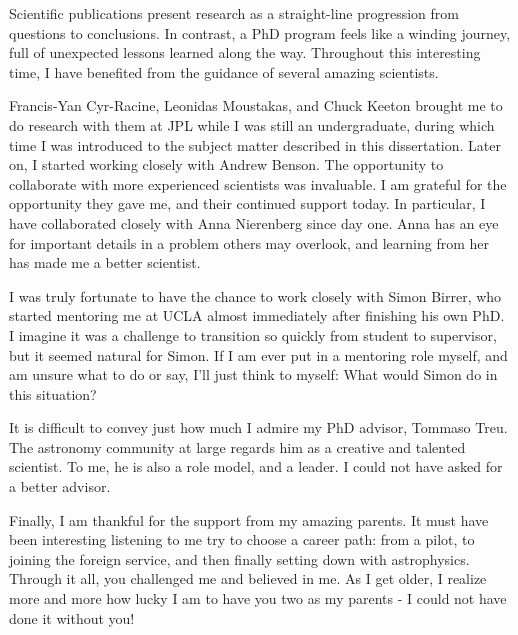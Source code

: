 {\indent Scientific publications present research as a straight-line progression from questions to conclusions. In contrast, a PhD program feels like a winding journey, full of unexpected lessons learned along the way. Throughout this interesting time, I have benefited from the guidance of several amazing scientists. 
	
Francis-Yan Cyr-Racine, Leonidas Moustakas, and Chuck Keeton brought me to do research with them at JPL while I was still an undergraduate, during which time I was introduced to the subject matter described in this dissertation. Later on, I started working closely with Andrew Benson. The opportunity to collaborate with more experienced scientists was invaluable. I am grateful for the opportunity they gave me, and their continued support today. In particular, I have collaborated closely with Anna Nierenberg since day one. Anna has an eye for important details in a problem others may overlook, and learning from her has made me a better scientist. 

I was truly fortunate to have the chance to work closely with Simon Birrer, who started mentoring me at UCLA almost immediately after finishing his own PhD. I imagine it was a challenge to transition so quickly from student to supervisor, but it seemed natural for Simon. If I am ever put in a mentoring role myself, and am unsure what to do or say, I'll just think to myself: What would Simon do in this situation? 

It is difficult to convey just how much I admire my PhD advisor, Tommaso Treu. The astronomy community at large regards him as a creative and talented scientist. To me, he is also a role model, and a leader. I could not have asked for a better advisor.  

Finally, I am thankful for the support from my amazing parents. It must have been interesting listening to me try to choose a career path: from a pilot, to joining the foreign service, and then finally setting down with astrophysics. Through it all, you challenged me and believed in me. As I get older, I realize more and more how lucky I am to have you two as my parents - I could not have done it without you! 
}